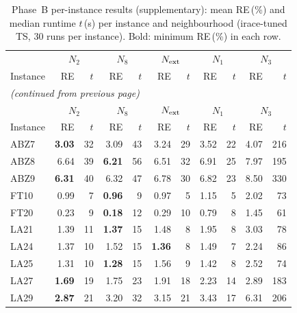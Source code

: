 \begin{longtable}{l | rr | rr | rr | rr | rr}
\caption{Phase~B per-instance results (supplementary): mean RE\,(\%) and median
runtime $t$\,(s) per instance and neighbourhood (irace-tuned TS, 30 runs per instance).
Bold: minimum RE\,(\%) in each row.}
\label{tab:phaseb_per_instance} \\
\hline
 & \multicolumn{2}{c|}{$N_2$} & \multicolumn{2}{c|}{$N_8$} &
  \multicolumn{2}{c|}{$N_{\rm ext}$} & \multicolumn{2}{c|}{$N_1$} &
  \multicolumn{2}{c}{$N_3$} \\
Instance & RE & $t$ & RE & $t$ & RE & $t$ & RE & $t$ & RE & $t$ \\
\hline
\endfirsthead
\multicolumn{11}{l}{\small\itshape (continued from previous page)} \\
\hline
 & \multicolumn{2}{c|}{$N_2$} & \multicolumn{2}{c|}{$N_8$} &
  \multicolumn{2}{c|}{$N_{\rm ext}$} & \multicolumn{2}{c|}{$N_1$} &
  \multicolumn{2}{c}{$N_3$} \\
Instance & RE & $t$ & RE & $t$ & RE & $t$ & RE & $t$ & RE & $t$ \\
\hline
\endhead
\hline
\endfoot
ABZ7           & \textbf{3.03} & 32 & 3.09 & 43 & 3.24 & 29 & 3.52 & 22 & 4.07 & 216 \\
ABZ8           & 6.64 & 39 & \textbf{6.21} & 56 & 6.51 & 32 & 6.91 & 25 & 7.97 & 195 \\
ABZ9           & \textbf{6.31} & 40 & 6.32 & 47 & 6.78 & 30 & 6.82 & 23 & 8.50 & 330 \\
FT10           & 0.99 & 7 & \textbf{0.96} & 9 & 0.97 & 5 & 1.15 & 5 & 2.02 & 73 \\
FT20           & 0.23 & 9 & \textbf{0.18} & 12 & 0.29 & 10 & 0.79 & 8 & 1.45 & 61 \\
LA21           & 1.39 & 11 & \textbf{1.37} & 15 & 1.48 & 8 & 1.95 & 8 & 3.03 & 78 \\
LA24           & 1.37 & 10 & 1.52 & 15 & \textbf{1.36} & 8 & 1.49 & 7 & 2.24 & 86 \\
LA25           & 1.31 & 10 & \textbf{1.28} & 15 & 1.56 & 9 & 1.42 & 8 & 2.52 & 74 \\
LA27           & \textbf{1.69} & 19 & 1.75 & 23 & 1.91 & 18 & 2.23 & 14 & 2.89 & 183 \\
LA29           & \textbf{2.87} & 21 & 3.20 & 32 & 3.15 & 21 & 3.43 & 17 & 6.31 & 206 \\

\end{longtable}
